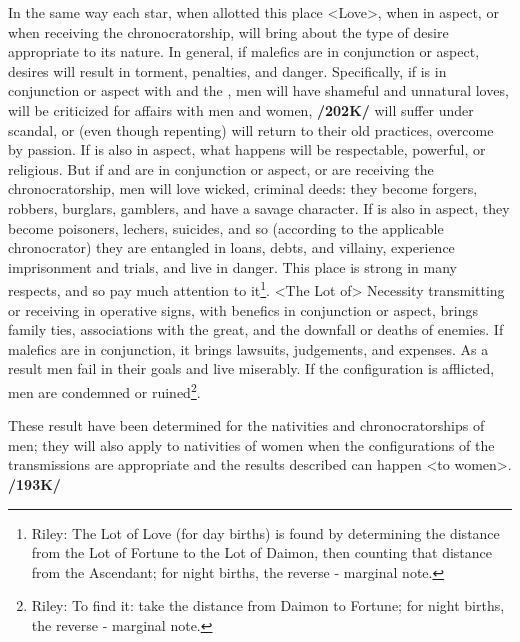 In the same way each star, when allotted this place <Love>, when in aspect, or when receiving the chronocratorship, will bring about the type of desire appropriate to its nature. In general, if malefics are in conjunction or aspect, desires will result in torment, penalties, and danger. Specifically, if \Saturn\xspace is in conjunction or aspect with \Venus\xspace and the \Moon, men will have shameful and unnatural loves, will be criticized for affairs with men and women, \textbf{/202K/} will suffer under scandal, or (even though repenting) will return to their old practices, overcome by passion. If \Jupiter\xspace is also in aspect, what happens will be respectable, powerful, or religious. But if \Mars\xspace and \Mercury\xspace are in conjunction or aspect, or are receiving the chronocratorship, men will love wicked, criminal deeds: they become forgers, robbers, burglars, gamblers, and have a savage character. If \Venus\xspace is also in aspect, they become poisoners, lechers, suicides, and so (according to the applicable chronocrator) they are entangled in loans, debts, and villainy, experience imprisonment and trials, and live in danger. This place is strong in many respects, and so pay much
attention to it\footnote{Riley: The Lot of Love (for day births) is found by determining the distance from the Lot of Fortune to the Lot of Daimon, then counting that distance from the Ascendant; for night births, the reverse - marginal note.}.
\enlargethispage{\baselineskip}
<The Lot of> Necessity  transmitting or receiving in operative signs, with benefics in conjunction or
aspect, brings family ties, associations with the great, and the downfall or deaths of enemies. If malefics are in conjunction, it brings lawsuits, judgements, and expenses. As a result men fail in their goals and live miserably. If the configuration is afflicted, men are condemned or ruined\footnote{Riley: To find it: take the distance from Daimon to Fortune; for night births, the reverse - marginal note.}.

These result have been determined for the nativities and chronocratorships of men; they will also apply to nativities of women when the configurations of the transmissions are appropriate and the results described can happen <to women>. \textbf{/193K/}

\newpage